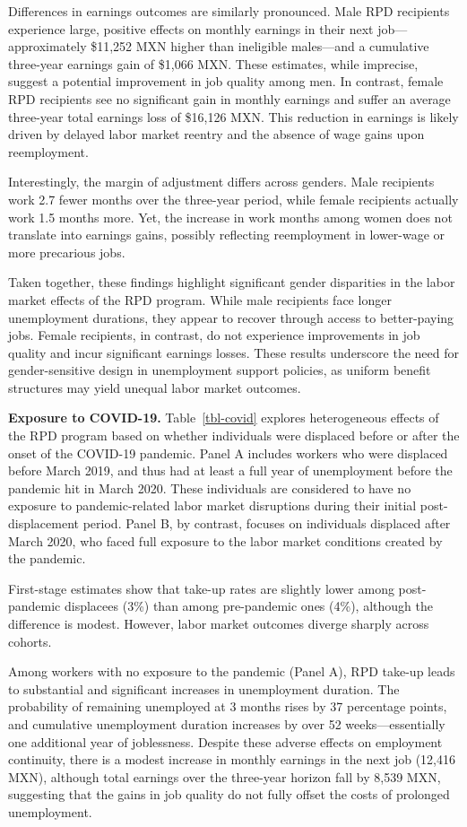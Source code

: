 \documentclass[
  4pt,
]{report}
\begin{document}
Differences in earnings outcomes are similarly pronounced. Male RPD
recipients experience large, positive effects on monthly earnings in
their next job---approximately \$11,252 MXN higher than ineligible
males---and a cumulative three-year earnings gain of \$1,066 MXN. These
estimates, while imprecise, suggest a potential improvement in job
quality among men. In contrast, female RPD recipients see no significant
gain in monthly earnings and suffer an average three-year total earnings
loss of \$16,126 MXN. This reduction in earnings is likely driven by
delayed labor market reentry and the absence of wage gains upon
reemployment.

Interestingly, the margin of adjustment differs across genders. Male
recipients work 2.7 fewer months over the three-year period, while
female recipients actually work 1.5 months more. Yet, the increase in
work months among women does not translate into earnings gains, possibly
reflecting reemployment in lower-wage or more precarious jobs.

Taken together, these findings highlight significant gender disparities
in the labor market effects of the RPD program. While male recipients
face longer unemployment durations, they appear to recover through
access to better-paying jobs. Female recipients, in contrast, do not
experience improvements in job quality and incur significant earnings
losses. These results underscore the need for gender-sensitive design in
unemployment support policies, as uniform benefit structures may yield
unequal labor market outcomes.

\textbf{Exposure to COVID-19.} Table~\ref{tbl-covid} explores
heterogeneous effects of the RPD program based on whether individuals
were displaced before or after the onset of the COVID-19 pandemic. Panel
A includes workers who were displaced before March 2019, and thus had at
least a full year of unemployment before the pandemic hit in March 2020.
These individuals are considered to have no exposure to pandemic-related
labor market disruptions during their initial post-displacement period.
Panel B, by contrast, focuses on individuals displaced after March 2020,
who faced full exposure to the labor market conditions created by the
pandemic.

First-stage estimates show that take-up rates are slightly lower among
post-pandemic displacees (3\%) than among pre-pandemic ones (4\%),
although the difference is modest. However, labor market outcomes
diverge sharply across cohorts.

Among workers with no exposure to the pandemic (Panel A), RPD take-up
leads to substantial and significant increases in unemployment duration.
The probability of remaining unemployed at 3 months rises by 37
percentage points, and cumulative unemployment duration increases by
over 52 weeks---essentially one additional year of joblessness. Despite
these adverse effects on employment continuity, there is a modest
increase in monthly earnings in the next job (12,416 MXN), although
total earnings over the three-year horizon fall by 8,539 MXN, suggesting
that the gains in job quality do not fully offset the costs of prolonged
unemployment.
\end{document}
